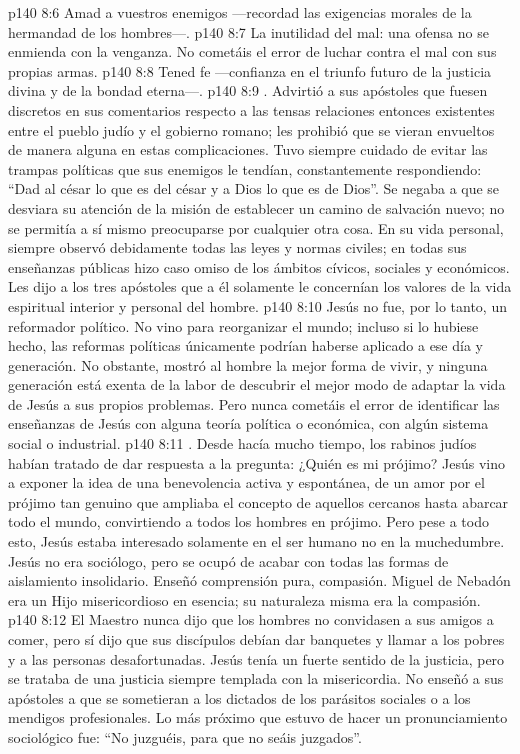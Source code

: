 \vs p140 8:6 Amad a vuestros enemigos ---recordad las exigencias morales de la hermandad de los hombres---.
\vs p140 8:7 La inutilidad del mal: una ofensa no se enmienda con la venganza. No cometáis el error de luchar contra el mal con sus propias armas.
\vs p140 8:8 Tened fe ---confianza en el triunfo futuro de la justicia divina y de la bondad eterna---.
\vs p140 8:9 . Advirtió a sus apóstoles que fuesen discretos en sus comentarios respecto a las tensas relaciones entonces existentes entre el pueblo judío y el gobierno romano; les prohibió que se vieran envueltos de manera alguna en estas complicaciones. Tuvo siempre cuidado de evitar las trampas políticas que sus enemigos le tendían, constantemente respondiendo: “Dad al césar lo que es del césar y a Dios lo que es de Dios”. Se negaba a que se desviara su atención de la misión de establecer un camino de salvación nuevo; no se permitía a sí mismo preocuparse por cualquier otra cosa. En su vida personal, siempre observó debidamente todas las leyes y normas civiles; en todas sus enseñanzas públicas hizo caso omiso de los ámbitos cívicos, sociales y económicos. Les dijo a los tres apóstoles que a él solamente le concernían los valores de la vida espiritual interior y personal del hombre.
\vs p140 8:10 Jesús no fue, por lo tanto, un reformador político. No vino para reorganizar el mundo; incluso si lo hubiese hecho, las reformas políticas únicamente podrían haberse aplicado a ese día y generación. No obstante, mostró al hombre la mejor forma de vivir, y ninguna generación está exenta de la labor de descubrir el mejor modo de adaptar la vida de Jesús a sus propios problemas. Pero nunca cometáis el error de identificar las enseñanzas de Jesús con alguna teoría política o económica, con algún sistema social o industrial.
\vs p140 8:11 . Desde hacía mucho tiempo, los rabinos judíos habían tratado de dar respuesta a la pregunta: ¿Quién es mi prójimo? Jesús vino a exponer la idea de una benevolencia activa y espontánea, de un amor por el prójimo tan genuino que ampliaba el concepto de aquellos cercanos hasta abarcar todo el mundo, convirtiendo a todos los hombres en prójimo. Pero pese a todo esto, Jesús estaba interesado solamente en el ser humano  no en la muchedumbre. Jesús no era sociólogo, pero se ocupó de acabar con todas las formas de aislamiento insolidario. Enseñó comprensión pura, compasión. Miguel de Nebadón era un Hijo misericordioso en esencia; su naturaleza misma era la compasión.
\vs p140 8:12 El Maestro nunca dijo que los hombres no convidasen a sus amigos a comer, pero sí dijo que sus discípulos debían dar banquetes y llamar a los pobres y a las personas desafortunadas. Jesús tenía un fuerte sentido de la justicia, pero se trataba de una justicia siempre templada con la misericordia. No enseñó a sus apóstoles a que se sometieran a los dictados de los parásitos sociales o a los mendigos profesionales. Lo más próximo que estuvo de hacer un pronunciamiento sociológico fue: “No juzguéis, para que no seáis juzgados”.
